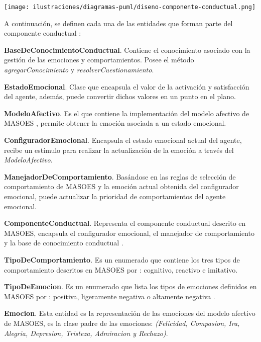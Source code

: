 \begin{ilustracion}[fuente=\yo, etiqueta=diseno-componente-conductual, titulo={Diseño de la Implementación del Componente Conductual}]
\texttt{[image: ilustraciones/diagramas-puml/diseno-componente-conductual.png]}
\end{ilustracion}

A continuación, se definen cada una de las entidades que forman parte del
componente conductual :

\textbf{BaseDeConocimientoConductual}. Contiene el conocimiento asociado con la
gestión de las emociones y comportamientos. Posee el método
\textit{agregarConocimiento} y \textit{resolverCuestionamiento}.

\textbf{EstadoEmocional}. Clase que encapsula el valor de la activación y
satisfacción del agente, además, puede convertir dichos valores
en un punto en el plano.

\textbf{ModeloAfectivo}. Es el que contiene la
implementación del modelo afectivo de MASOES ,
permite obtener la emoción asociada a un estado emocional.

\textbf{ConfiguradorEmocional}. Encapsula el estado emocional actual del agente,
recibe un estímulo para realizar la actualización de la emoción a través del \textit{ModeloAfectivo}.

\textbf{ManejadorDeComportamiento}. Basándose en las reglas de selección de
comportamiento de MASOES  y la emoción actual obtenida del configurador
emocional, puede actualizar la prioridad de comportamientos del agente
emocional.

\textbf{ComponenteConductual}. Representa el componente conductual
descrito en MASOES, encapsula el configurador emocional, el manejador de
comportamiento y la base de conocimiento conductual .

\textbf{TipoDeComportamiento}. Es un enumerado que contiene los tres tipos de
comportamiento descritos en MASOES por \cite{perozo2011}: cognitivo, reactivo e imitativo.

\textbf{TipoDeEmocion}. Es un enumerado que lista los tipos de emociones
definidos en MASOES por \cite{perozo2011}: positiva,
ligeramente negativa o altamente negativa .

\textbf{Emocion}. Esta entidad es la representación de las emociones del modelo
afectivo de MASOES, es la clase padre de las emociones:
\textit{(Felicidad, Compasion, Ira, Alegria, Depresion, Tristeza, Admiracion y Rechazo)}.


